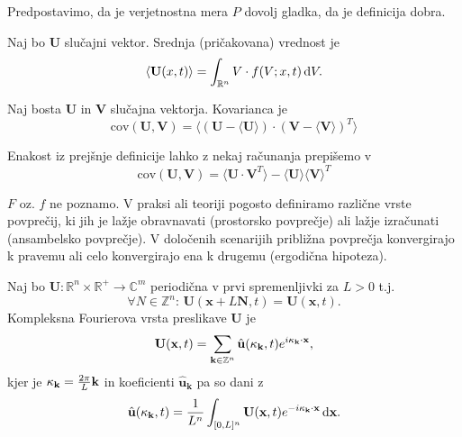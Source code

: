 \documentclass[mat2, tisk]{fmfdelo}
\newcommand{\R}{\mathbb R}
\newcommand{\Z}{\mathbb Z}
\newcommand{\bd}{\textbf}
\newcommand{\C}{\mathbb C}
\begin{document}
\begin{opomba}
Predpostavimo, da je verjetnostna mera $P$ dovolj gladka, da je definicija dobra.
\end{opomba}

\begin{definicija}
Naj bo $\bd{U}$ slučajni vektor. Srednja (pričakovana) vrednost je 
\begin{equation}
\langle \bd{U}(x, t) \rangle = \int_{\R^n} V \cdot f(V; x, t) \dif V.
\end{equation}
\end{definicija}

\begin{definicija}
Naj bosta $\bd{U}$ in $\bd{V}$ slučajna vektorja. Kovarianca je 
\begin{equation}
\text{cov}(\bd{U}, \bd{V}) = \langle (\bd{U} - \langle \bd{U} \rangle)\cdot (\bd{V} - \langle \bd{V} \rangle)^T \rangle
\end{equation}
\end{definicija}

\begin{opomba}
Enakost iz prejšnje definicije lahko z nekaj računanja prepišemo v 
\begin{equation}
\text{cov}(\bd{U}, \bd{V}) = \langle \bd{U}\cdot \bd{V}^T \rangle - \langle \bd{U} \rangle  \langle \bd{V} \rangle^T
\end{equation}
\end{opomba}

\noindent
$F$ oz. $f$ ne poznamo. V praksi ali teoriji pogosto definiramo različne vrste povprečij, 
ki jih je lažje obravnavati (prostorsko povprečje) ali lažje izračunati (ansambelsko povprečje).
V določenih scenarijih približna povprečja konvergirajo k pravemu 
ali celo konvergirajo ena k drugemu (ergodična hipoteza). 

\begin{definicija}
Naj bo $\bd{U}: \R^n \times \R^+ \rightarrow \C^m$ periodična v prvi spremenljivki za $L>0$ t.j. 
$$
\forall N\in \Z^n: \,\bd{U}(\bd{x} + L\bd{N}, t) = \bd{U}(\bd{x}, t).
$$
Kompleksna Fourierova vrsta preslikave $\bd{U}$ je 
\begin{equation}
\bd{U}(\bd{x}, t) = \sum_{\bd{k}\in \Z^{n}} \hat{\bd{u}}(\bd{\text{$\kappa$}}_\bd{k}, t) e^{i\bd{\text{$\kappa$}}_\bd{k} \cdot \bd{x}},
\end{equation}
kjer je $\bd{\text{$\kappa$}}_\bd{k} = \frac{2\pi}{L} \bd{k}$ in koeficienti $\hat{\bd{u}}_\bd{k}$ pa so dani z 
\begin{equation}
\hat{\bd{u}}(\bd{\text{$\kappa$}}_\bd{k}, t) = \frac{1}{L^n} \int_{[0, L]^n} \bd{U}(\bd{x}, t) e^{-i\bd{\text{$\kappa$}}_\bd{k} \cdot \bd{x}} \dif \bd{x}.
\end{equation}
\end{definicija}
\end{document}
